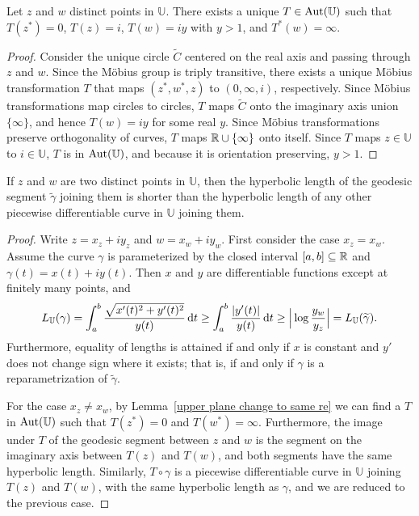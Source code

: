 \begin{lemma}\label{upper plane change to same re}
Let $z$ and $w$ distinct points in $\mathbb{U}$. There exists a unique $T\in\mathrm{Aut}(\mathbb{U})$ such that $T(z^*)=0$, $T(z)=i$, $T(w)=iy$ with $y>1$, and $T^*(w)=\infty$.
\end{lemma}
\begin{proof}
Consider the unique circle $\widetilde{C}$ centered on the real axis and passing through $z$ and $w$. Since the M\"obius group is triply transitive, there exists a unique M\"obius transformation $T$ that maps $(z^*,w^*,z)$ to $(0,\infty,i)$, respectively. Since M\"obius transformations map circles to circles, $T$ maps $\widetilde{C}$ onto the imaginary axis union $\{\infty\}$, and hence $T(w)=iy$ for some real $y$. Since M\"obius transformations preserve orthogonality of curves, $T$ maps $\mathbb{R}\cup\{\infty\}$ onto itself. Since $T$ maps $z\in\mathbb{U}$ to $i\in\mathbb{U}$, $T$ is in $\mathrm{Aut}(\mathbb{U})$, and because it is orientation preserving, $y>1$.
\end{proof}
\begin{lemma}
If $z$ and $w$ are two distinct points in $\mathbb{U}$, then the hyperbolic length of the geodesic segment $\widetilde{\gamma}$ joining them is shorter than the hyperbolic length of any other piecewise differentiable curve in $\mathbb{U}$ joining them.
\end{lemma}
\begin{proof}
Write $z=x_z+iy_z$ and $w=x_w+iy_w$. First consider the case $x_z=x_w$. Assume the curve $\gamma$ is parameterized by the closed interval $[a,b]\subseteq\mathbb{R}$ and $\gamma(t)=x(t)+iy(t)$. Then $x$ and $y$ are differentiable functions except at finitely many points, and
\[L_{\mathbb{U}}(\gamma)=\int_{a}^{b}\frac{\sqrt{x'(t)^2+y'(t)^2}}{y(t)}\mathop{}\!\mathrm{d} t\geq\int_{a}^{b}\frac{|y'(t)|}{y(t)}\mathop{}\!\mathrm{d} t\geq\Big|\log\frac{y_w}{y_z}\Big|=L_{\mathbb{U}}(\widetilde{\gamma}).\]
Furthermore, equality of lengths is attained if and only if $x$ is constant and $y'$ does not change sign where it exists; that is, if and only if $\gamma$ is a reparametrization of $\widetilde{\gamma}$.\par
For the case $x_z\neq x_w$, by Lemma~\ref{upper plane change to same re} we can find a $T$ in $\mathrm{Aut}(\mathbb{U})$ such that $T(z^*)=0$ and $T(w^*)=\infty$. Furthermore, the image under $T$ of the geodesic segment between $z$ and $w$ is the segment on the imaginary axis between $T(z)$ and $T(w)$, and both segments have the same hyperbolic length. Similarly, $T\circ\gamma$ is a piecewise differentiable curve in $\mathbb{U}$ joining $T(z)$ and $T(w)$, with the same hyperbolic length as $\gamma$, and we are reduced to the previous case.
\end{proof}
